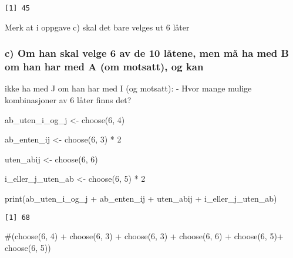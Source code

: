 \documentclass[
  12pt,
  a4paper,
  DIV=11,
  numbers=noendperiod]{scrartcl}
\newenvironment{Shaded}{\begin{snugshade}}{\end{snugshade}}
\newcommand{\CommentTok}[1]{\textcolor[rgb]{0.37,0.37,0.37}{#1}}
\newcommand{\DecValTok}[1]{\textcolor[rgb]{0.68,0.00,0.00}{#1}}
\newcommand{\FunctionTok}[1]{\textcolor[rgb]{0.28,0.35,0.67}{#1}}
\newcommand{\NormalTok}[1]{\textcolor[rgb]{0.00,0.23,0.31}{#1}}
\newcommand{\OtherTok}[1]{\textcolor[rgb]{0.00,0.23,0.31}{#1}}
\newcommand{\SpecialCharTok}[1]{\textcolor[rgb]{0.37,0.37,0.37}{#1}}
\begin{document}
\begin{verbatim}
[1] 45
\end{verbatim}

Merk at i oppgave c) skal det bare velges ut 6 låter

\subsubsection{c) Om han skal velge 6 av de 10 låtene, men må ha med B
om han har med A (om motsatt), og
kan}\label{c-om-han-skal-velge-6-av-de-10-luxe5tene-men-muxe5-ha-med-b-om-han-har-med-a-om-motsatt-og-kan}

ikke ha med J om han har med I (og motsatt): - Hvor mange mulige
kombinasjoner av 6 låter finns det?

\begin{Shaded}
\begin{Highlighting}[]
\NormalTok{ab\_uten\_i\_og\_j }\OtherTok{\textless{}{-}} \FunctionTok{choose}\NormalTok{(}\DecValTok{6}\NormalTok{, }\DecValTok{4}\NormalTok{)}


\NormalTok{ab\_enten\_ij }\OtherTok{\textless{}{-}} \FunctionTok{choose}\NormalTok{(}\DecValTok{6}\NormalTok{, }\DecValTok{3}\NormalTok{) }\SpecialCharTok{*} \DecValTok{2} 

\NormalTok{uten\_abij }\OtherTok{\textless{}{-}} \FunctionTok{choose}\NormalTok{(}\DecValTok{6}\NormalTok{, }\DecValTok{6}\NormalTok{)}


\NormalTok{i\_eller\_j\_uten\_ab }\OtherTok{\textless{}{-}} \FunctionTok{choose}\NormalTok{(}\DecValTok{6}\NormalTok{, }\DecValTok{5}\NormalTok{) }\SpecialCharTok{*} \DecValTok{2}



\FunctionTok{print}\NormalTok{(ab\_uten\_i\_og\_j }\SpecialCharTok{+}\NormalTok{ ab\_enten\_ij }\SpecialCharTok{+}\NormalTok{ uten\_abij }\SpecialCharTok{+}\NormalTok{ i\_eller\_j\_uten\_ab)}
\end{Highlighting}
\end{Shaded}

\begin{verbatim}
[1] 68
\end{verbatim}

\begin{Shaded}
\begin{Highlighting}[]
\CommentTok{\#(choose(6, 4) + choose(6, 3) + choose(6, 3) + choose(6, 6) + choose(6, 5)+ choose(6, 5))}
\end{Highlighting}
\end{Shaded}
\end{document}
